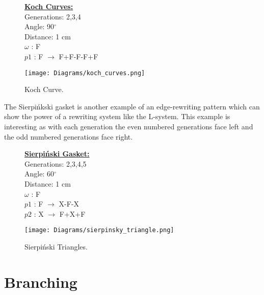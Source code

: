 \begin{figure}[htbp]
	\raggedright
	\textbf{\underline{Koch Curves:}} \\
	Generations: 2,3,4\\
	Angle: 90$^\circ$\\
	Distance: 1 cm\\
	$\omega$ : F \\
	$p1$ : F $\rightarrow$ F+F-F-F+F\\
	{\centering
		\vspace{7px}
		\texttt{[image: Diagrams/koch\_curves.png]}
		\caption{Koch Curve.} \label{KochSnowflake}
	}
\end{figure}
\FloatBarrier

\noindent
The Sierpi\'{n}kski gasket is another example of an edge-rewriting pattern which can show the power of a rewriting system like the L-system. This example is interesting as with each generation the even numbered generations face left and the odd numbered generations face right.


\begin{figure}[htbp]
	\raggedright
	\textbf{\underline{Sierpi\'{n}ski Gasket:}} \\
	Generations: 2,3,4,5\\
	Angle: 60$^\circ$\\
	Distance: 1 cm\\
	$\omega$ : F\\
	$p1$ : F $\rightarrow$ X-F-X\\
	$p2$ : X $\rightarrow$ F+X+F\\
	{\centering
		\vspace{7px}
		\texttt{[image: Diagrams/sierpinsky\_triangle.png]}
		\caption{Sierpi\'{n}ski Triangles.}
	}
\end{figure}
\FloatBarrier

\section{Branching} \label{branching}

